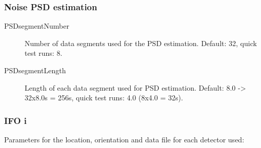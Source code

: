 \documentclass[10pt]{article}
\begin{document}
\subsubsection{Noise PSD estimation}
\begin{description}
\item[PSDsegmentNumber] Number of data segments used for the PSD estimation.  Default: 32, quick test runs: 8.
\item[PSDsegmentLength] Length of each data segment used for PSD estimation.  Default: 8.0 -> 32x8.0s = 256s, quick test runs: 4.0 (8x4.0 = 32s).
\end{description}




\subsubsection{IFO i}
Parameters for the location, orientation and data file for each detector used:
\end{document}
